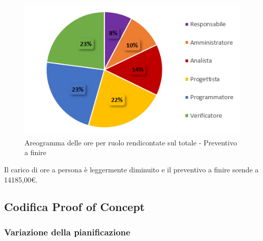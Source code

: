 \begin{figure}[H]
  \centering
  \includegraphics[scale=0.9]{immagini/ore_ruolo_preventivo_finire.png}
  \caption{Areogramma delle ore per ruolo rendicontate sul totale - Preventivo a finire}
\end{figure}

Il carico di ore a persona è leggermente diminuito e il preventivo a finire scende a 14185,00€.

\pagebreak

\subsection{Codifica Proof of Concept} \label{subsection:consuntivo_PoC}
\subsubsection{Variazione della pianificazione} \label{subsubsection:variazione_pianificazione_PoC}

